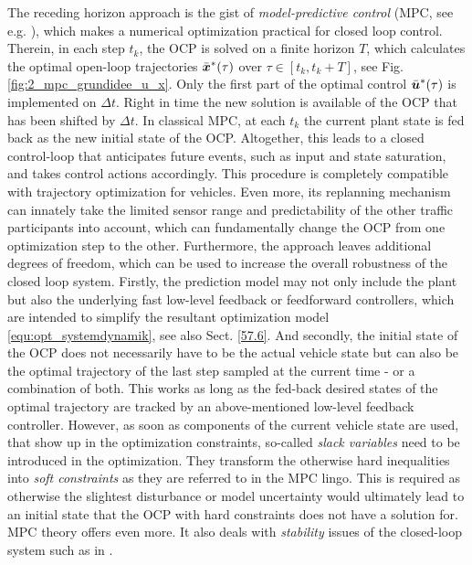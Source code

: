 The receding horizon approach is the gist of \emph{model-predictive control} (MPC, see e.g. \cite{rawlings2000tutorial}),%
 which makes a numerical optimization practical for closed loop control. Therein, in each step $t_k$, the OCP is solved on a finite horizon $T$, which calculates the optimal open-loop trajectories $\bar{\boldsymbol{x}}^\ast(\tau)$ over $\tau \in [t_k,t_k+T]$, see Fig. \ref{fig:2_mpc_grundidee_u_x}. Only the first part of the optimal control $\bar{\boldsymbol{u}}^\ast(\tau)$ is implemented on $\Delta t$. Right in time the new solution is available of the OCP that has been shifted by $\Delta t$. In classical MPC, at each $t_k$ the current plant state is fed back as the new initial state of the OCP. Altogether, this leads to a closed control-loop that anticipates future events, such as input and state saturation, and takes control actions accordingly.
This procedure is completely compatible with trajectory optimization for vehicles. Even more, its replanning mechanism can innately take the limited sensor range and predictability of the other traffic participants into account, which can fundamentally change the OCP from one optimization step to the other. Furthermore, the approach leaves additional degrees of freedom, which can be used to increase the overall robustness of the closed loop system. Firstly, the prediction model may not only include the plant but also the underlying fast low-level feedback or feedforward controllers, which are intended to simplify the resultant optimization model \eqref{equ:opt_systemdynamik}, see also Sect. \ref{57.6}. And secondly, the initial state of the OCP does not necessarily have to be the actual vehicle state but can also be the optimal trajectory of the last step sampled at the current time - or a combination of both. This works as long as the fed-back desired states of the optimal trajectory are tracked by an above-mentioned low-level feedback controller. However, as soon as components of the current vehicle state are used, that show up in the optimization constraints, so-called \emph{slack variables} need to be introduced in the optimization. They transform the otherwise hard inequalities into \emph{soft constraints} as they are referred to in the MPC lingo. This is required as otherwise the slightest disturbance or model uncertainty would ultimately lead to an initial state that the OCP with hard constraints does not have a solution for.
MPC theory offers even more. It also deals with \emph{stability} issues of the closed-loop system such as in \cite{gruene2011nonlinear}.%
